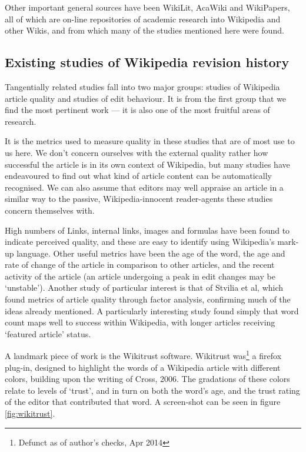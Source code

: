 Other important general sources have been WikiLit,\cite{wikilit}
AcaWiki\cite{acawiki} and WikiPapers\cite{wikipapers}, all of which
are on-line repositories of academic research into Wikipedia and other
Wikis, and from which many of the studies mentioned here were found.


\subsection*{Existing studies of Wikipedia revision history}
Tangentially related studies fall into two major groups: studies of
Wikipedia article quality and studies of edit behaviour.  It is from
the first group that we find the most pertinent work --- it is also
one of the most fruitful areas of research.

It is the metrics used to measure quality in these studies that are of
most use to us here. We don't concern ourselves with the external
quality rather how successful the article is in its own context of
Wikipedia, but many studies have endeavoured to find out what kind of
article content can be automatically recognised. We can also assume
that editors may well appraise an article in a similar way to the
passive, Wikipedia-innocent reader-agents these studies concern
themselves with.

High numbers of Links, internal links, images and formulas have been
found to indicate perceived
quality,\cite{Lucassen2010}\cite{mcguinness2006} and these are easy to
identify using Wikipedia's mark-up language. Other useful metrics have
been the age of the word,\cite{Cross2006} the age and rate of change
of the article in comparison to other articles,\cite{Zeng2006} and the
recent activity of the article (an article undergoing a peak in edit
changes may be `unstable').\cite{Adler2006} Another study of
particular interest is that of Stvilia et al, which found metrics of
article quality through factor analysis,\cite{Stvilia2005} confirming
much of the ideas already mentioned. A particularly interesting study
found simply that word count maps well to success within Wikipedia,
with longer articles receiving `featured article'
status.\cite{blumenstock2008size}

A landmark piece of work is the Wikitrust software.\cite{Adler2007}
Wikitrust was\footnote{Defunct as of author's checks, Apr 2014} a
firefox plug-in, designed to highlight the words of a Wikipedia article
with different colors, building upon the writing of Cross,
2006.\cite{Cross2006} The gradations of these colors relate to levels
of `trust', and in turn on both the word's age, and the trust rating
of the editor that contributed that word. A screen-shot can be seen in
figure \ref{fig:wikitrust}. 

